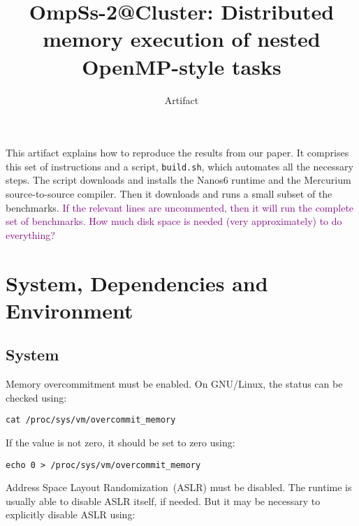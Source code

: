 \documentclass{article}
\newcommand{\paul}[1]{\textcolor{purple}{#1}}
\newcommand{\code}[1]{\texttt{#1}}
\begin{document}
\title{OmpSs-2@Cluster: Distributed memory execution of nested OpenMP-style tasks}

\date{Artifact}

\maketitle

This artifact explains how to reproduce the results from our paper.  It
comprises this set of instructions and a script, \code{build.sh}, which
automates all the necessary steps. The script downloads and installs the Nanos6 runtime
and the Mercurium source-to-source compiler. Then it downloads and runs a small
subset of the benchmarks. \paul{If the relevant lines are uncommented, then it will run
the complete set of benchmarks.} \paul{How much disk space is needed (very approximately) to
do everything?}


\section{System, Dependencies and Environment}

\subsection{System}

Memory overcommitment must be enabled. On GNU/Linux, the status can be checked using:

\begin{lstlisting}
cat /proc/sys/vm/overcommit_memory
\end{lstlisting}

If the value is not zero, it should be set to zero using:

\begin{lstlisting}
echo 0 > /proc/sys/vm/overcommit_memory
\end{lstlisting}

Address Space Layout Randomization~(ASLR) must be disabled.  The runtime is
usually able to disable ASLR itself, if needed. But it may be necessary to
explicitly disable ASLR using:
\end{document}
